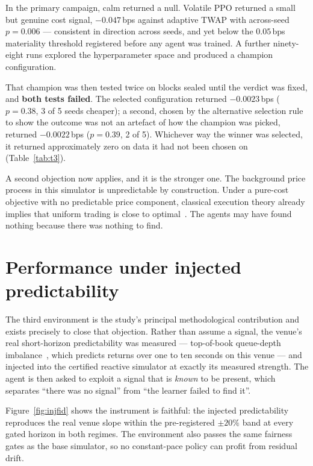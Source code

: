In the primary campaign, calm returned a null. Volatile PPO returned a small but genuine
cost signal, $-0.047$\,bps against adaptive TWAP with across-seed $p = 0.006$ --- consistent
in direction across seeds, and yet below the $0.05$\,bps materiality threshold registered
before any agent was trained. A further ninety-eight runs explored the hyperparameter space
and produced a champion configuration.

That champion was then tested twice on blocks sealed until the verdict was fixed, and
\textbf{both tests failed}. The selected configuration returned $-0.0023$\,bps
($p = 0.38$, 3 of 5 seeds cheaper); a second, chosen by the alternative selection rule to
show the outcome was not an artefact of how the champion was picked, returned $-0.0022$\,bps
($p = 0.39$, 2 of 5). Whichever way the winner was selected, it returned approximately zero
on data it had not been chosen on (Table~\ref{tab:t3}).

A second objection now applies, and it is the stronger one. The background price process in
this simulator is unpredictable by construction. Under a pure-cost objective with no
predictable price component, classical execution theory already implies that uniform trading
is close to optimal~\autocite{almgren2001optimal}. The agents may have found nothing because
there was nothing to find.

\section{Performance under injected predictability}\label{sec:res-injected}

The third environment is the study's principal methodological contribution and exists
precisely to close that objection. Rather than assume a signal, the venue's real
short-horizon predictability was measured --- top-of-book queue-depth
imbalance~\autocite{gould2016queue}, which predicts returns over one to ten seconds on this
venue --- and injected into the certified reactive simulator at exactly its measured
strength. The agent is then asked to exploit a signal that is \emph{known} to be present,
which separates ``there was no signal'' from ``the learner failed to find it''.

Figure~\ref{fig:injfid} shows the instrument is faithful: the injected predictability
reproduces the real venue slope within the pre-registered $\pm 20\%$ band at every gated
horizon in both regimes. The environment also passes the same fairness gates as the base
simulator, so no constant-pace policy can profit from residual drift.


